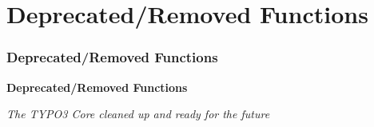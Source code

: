 %

\section{Deprecated/Removed Functions}
\begin{frame}[fragile]
	\frametitle{Deprecated/Removed Functions}

	\begin{center}\huge{\color{typo3darkgrey}\textbf{Deprecated/Removed Functions}}\end{center}
	\begin{center}\large{\textit{The TYPO3 Core cleaned up and ready for the future}}\end{center}

\end{frame}

